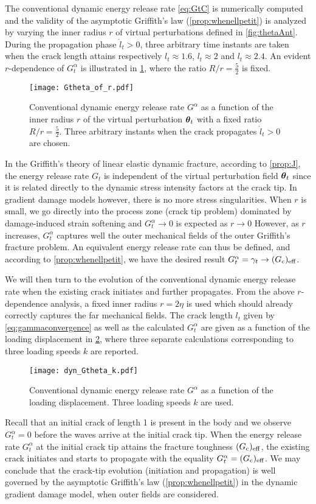 The conventional dynamic energy release rate \eqref{eq:GtC} is numerically computed and the validity of the asymptotic Griffith's law (\cref{prop:whenellpetit}) is analyzed by varying the inner radius $r$ of virtual perturbations defined in \cref{fig:thetaAnt}. During the propagation phase $\dot{l}_t>0$, three arbitrary time instants are taken when the crack length attains respectively $l_t\approx 1.6$, $l_t\approx 2$ and $l_t\approx 2.4$. An evident $r$-dependence of $G^\alpha_t$ is illustrated in \cref{fig:indvelocity}, where the ratio $R/r=\frac{5}{2}$ is fixed.
\begin{figure}[htbp]
\centering
\texttt{[image: Gtheta\_of\_r.pdf]}
\caption{Conventional dynamic energy release rate $G^\alpha$ as a function of the inner radius $r$ of the virtual perturbation $\vtheta_t$ with a fixed ratio $R/r=\frac{5}{2}$. Three arbitrary instants when the crack propagates $\dot{l}_t>0$ are chosen.} \label{fig:indvelocity}
\end{figure}
In the Griffith's theory of linear elastic dynamic fracture, according to \cref{prop:J}, the energy release rate $G_t$ is independent of the virtual perturbation field $\vtheta_t$ since it is related directly to the dynamic stress intensity factors at the crack tip. In gradient damage models however, there is no more stress singularities. When $r$ is small, we go directly into the process zone (crack tip problem) dominated by damage-induced strain softening and $G^\alpha_t\to 0$ is expected as $r\to 0$ However, as $r$ increases, $G^\alpha_t$ captures well the outer mechanical fields of the outer Griffith's fracture problem. An equivalent energy release rate can thus be defined, and according to \cref{prop:whenellpetit}, we have the desired result $G^\alpha_t=\gamma_t\to (G_\mathrm{c})_\mathrm{eff}$.

We will then turn to the evolution of the conventional dynamic energy release rate when the existing crack initiates and further propagates. From the above $r$-dependence analysis, a fixed inner radius $r=2\eta$ is used which should already correctly captures the far mechanical fields. The crack length $l_t$ given by \eqref{eq:gammaconvergence} as well as the calculated $G^\alpha_t$ are given as a function of the loading displacement in \cref{fig:evoGtGc}, where three separate calculations corresponding to three loading speeds $k$ are reported.
\begin{figure}[htbp]
\centering
\texttt{[image: dyn\_Gtheta\_k.pdf]}
\caption{Conventional dynamic energy release rate $G^\alpha$ as a function of the loading displacement. Three loading speeds $k$ are used.} \label{fig:evoGtGc}
\end{figure}
Recall that an initial crack of length 1 is present in the body and we observe $G^\alpha_t=0$ before the waves arrive at the initial crack tip. When the energy release rate $G^\alpha_t$ at the initial crack tip attains the fracture toughness $(G_\mathrm{c})_\mathrm{eff}$, the existing crack initiates and starts to propagate with the equality $G^\alpha_t=(G_\mathrm{c})_\mathrm{eff}$. We may conclude that the crack-tip evolution (initiation and propagation) is well governed by the asymptotic Griffith's law (\cref{prop:whenellpetit}) in the dynamic gradient damage model, when outer fields are considered.

